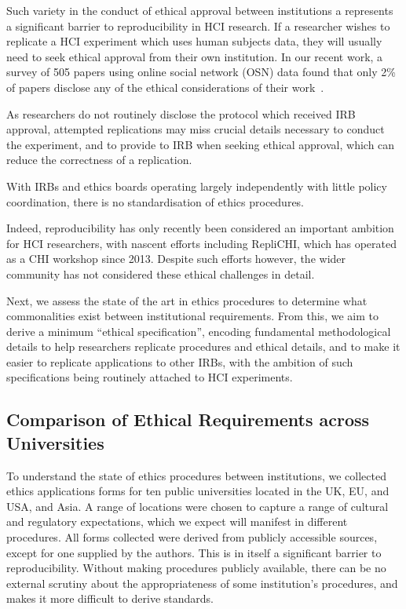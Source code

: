 Such variety in the conduct of ethical approval between institutions a
represents a significant barrier to reproducibility in HCI research.
If a researcher wishes to replicate a HCI experiment which uses human
subjects data, they will usually need to seek ethical approval from
their own institution. In our recent work, a survey of 505 papers
using online social network (OSN) data found that only 2\% of papers
disclose any of the ethical considerations of their
work~\cite{hutton:reproducible}.


As researchers do not routinely disclose the protocol which
received IRB approval, attempted replications may miss crucial details
necessary to conduct the experiment, and to provide to IRB when seeking
ethical approval, which can reduce the correctness of a replication.

With IRBs and ethics boards operating largely independently with little policy
coordination, there is no standardisation of ethics procedures.

Indeed, reproducibility has only recently been considered an important
ambition for HCI researchers, with nascent efforts including RepliCHI, which
has operated as a CHI workshop since 2013. Despite such efforts however, the
wider community has not considered these ethical challenges in detail.

Next, we assess the state of the art in ethics procedures to determine what
commonalities exist between institutional requirements. From this, we aim to
derive a minimum ``ethical specification'', encoding fundamental
methodological details to help researchers replicate procedures and ethical
details, and to make it easier to replicate applications to other IRBs, with
the ambition of such specifications being routinely attached to HCI
experiments.


\subsection{Comparison of Ethical Requirements across Universities}

To understand the state of ethics procedures between institutions, we
collected ethics applications forms for ten public universities located in the
UK, EU, and USA, and Asia. A range of locations were chosen to capture a range of
cultural and regulatory expectations, which we expect will manifest in
different procedures. All forms collected were derived from publicly
accessible sources, except for one supplied by the authors. This is in
itself a significant barrier to reproducibility. Without making procedures publicly 
available, there can be no external scrutiny about the appropriateness of some institution's
procedures, and makes it more difficult to derive standards.

